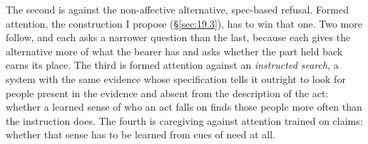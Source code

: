 The second is against the non-affective alternative, spec-based refusal. Formed attention, the construction I propose (\S\ref{sec:19.3}), has to win that one. Two more follow, and each asks a narrower question than the last, because each gives the alternative more of what the bearer has and asks whether the part held back earns its place. The third is formed attention against an \emph{instructed search}, a system with the same evidence whose specification tells it outright to look for people present in the evidence and absent from the description of the act: whether a learned sense of who an act falls on finds those people more often than the instruction does. The fourth is caregiving against attention trained on claims: whether that sense has to be learned from cues of need at all.


